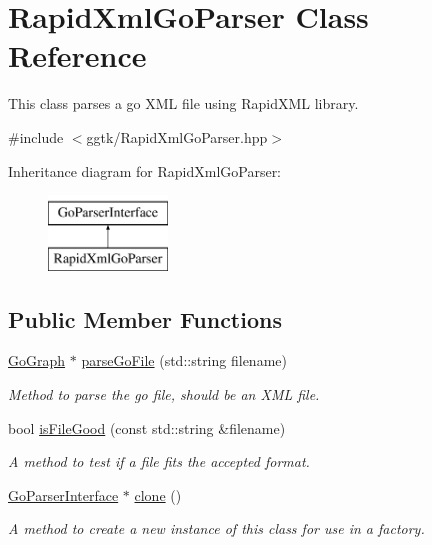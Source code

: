 \hypertarget{classRapidXmlGoParser}{}\section{Rapid\+Xml\+Go\+Parser Class Reference}
\label{classRapidXmlGoParser}


This class parses a go X\+ML file using Rapid\+X\+ML library.  




{\ttfamily \#include $<$ggtk/\+Rapid\+Xml\+Go\+Parser.\+hpp$>$}

Inheritance diagram for Rapid\+Xml\+Go\+Parser\+:\begin{figure}[H]
\begin{center}
\leavevmode
\includegraphics[height=2.000000cm]{classRapidXmlGoParser}
\end{center}
\end{figure}
\subsection*{Public Member Functions}
\begin{DoxyCompactItemize}
\item 
\hyperlink{classGoGraph}{Go\+Graph} $\ast$ \hyperlink{classRapidXmlGoParser_a7c42085d86c58983601fdada4aaacd9d}{parse\+Go\+File} (std\+::string filename)
\begin{DoxyCompactList}\small\item\em Method to parse the go file, should be an X\+ML file. \end{DoxyCompactList}\item 
bool \hyperlink{classRapidXmlGoParser_a945a31fd86bd35720d4158caa35302da}{is\+File\+Good} (const std\+::string \&filename)
\begin{DoxyCompactList}\small\item\em A method to test if a file fits the accepted format. \end{DoxyCompactList}\item 
\hyperlink{classGoParserInterface}{Go\+Parser\+Interface} $\ast$ \hyperlink{classRapidXmlGoParser_af69641207e01be186f523939ce03f847}{clone} ()
\begin{DoxyCompactList}\small\item\em A method to create a new instance of this class for use in a factory. \end{DoxyCompactList}\end{DoxyCompactItemize}



